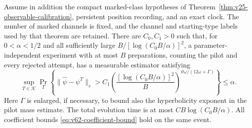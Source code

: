 \begin{corollary}
\label{cor:v62-total-budget}
Assume in addition the compact marked-class hypotheses of
Theorem~\ref{thm:v25-observable-calibration}, persistent position recording,
and an exact clock.  The number of marked channels is fixed, and the
channel and starting-type labels used by that theorem are retained.
There are $C_0,C_1>0$ such that, for $0<\alpha<1/2$ and all sufficiently
large $B/[\log(C_0B/\alpha)]^2$, a parameter-independent experiment with
at most $B$ preparations, counting the pilot and every rejected attempt,
has a measurable estimator satisfying
\begin{equation}\label{eq:v62-total-budget-rate}
 \sup_{T\in\mathcal K}\Pr_T\left\{
  \|\widehat\psi-\psi^T\|_r>
 C_1\left(\frac{[\log(C_0B/\alpha)]^2}{B}\right)^{
                  \vartheta\omega/(12\omega+\Gamma)}\right\}
 \le\alpha.
\end{equation}
Here $\Gamma$ is enlarged, if necessary, to bound also the hyperbolicity
exponent in the pilot mass estimate.  The total evolution time is at
most $CB\log(C_0B/\alpha)$.  All coefficient bounds
\eqref{eq:v62-coefficient-bound} hold on the same event.
\end{corollary}

